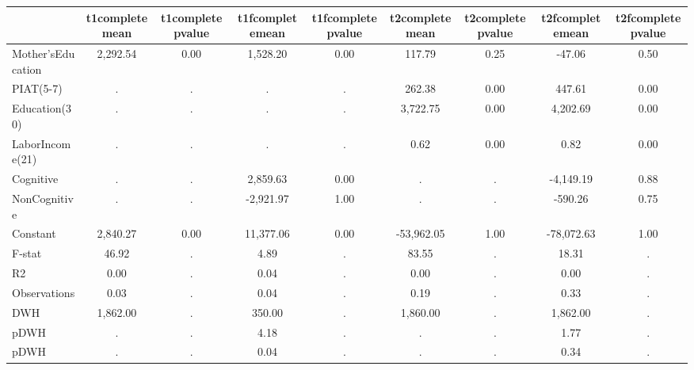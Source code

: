 \begin{table}[htbp]
\begin{tabular}{lcccccccc} \hline \hline
 & t1completemean  & t1completepvalue  & t1fcompletemean  & t1fcompletepvalue  & t2completemean  & t2completepvalue  & t2fcompletemean  & t2fcompletepvalue  \\  \hline 
Mother'sEducation &     2,292.54 &         0.00 &     1,528.20 &         0.00 &       117.79 &         0.25 &       -47.06 &         0.50 \\  
PIAT(5-7) &            . &            . &            . &            . &       262.38 &         0.00 &       447.61 &         0.00 \\  
Education(30) &            . &            . &            . &            . &     3,722.75 &         0.00 &     4,202.69 &         0.00 \\  
LaborIncome(21) &            . &            . &            . &            . &         0.62 &         0.00 &         0.82 &         0.00 \\  
Cognitive &            . &            . &     2,859.63 &         0.00 &            . &            . &    -4,149.19 &         0.88 \\  
NonCognitive &            . &            . &    -2,921.97 &         1.00 &            . &            . &      -590.26 &         0.75 \\  
Constant &     2,840.27 &         0.00 &    11,377.06 &         0.00 &   -53,962.05 &         1.00 &   -78,072.63 &         1.00 \\  
F-stat &        46.92 &            . &         4.89 &            . &        83.55 &            . &        18.31 &            . \\  
R2 &         0.00 &            . &         0.04 &            . &         0.00 &            . &         0.00 &            . \\  
Observations &         0.03 &            . &         0.04 &            . &         0.19 &            . &         0.33 &            . \\  
DWH &     1,862.00 &            . &       350.00 &            . &     1,860.00 &            . &     1,862.00 &            . \\  
pDWH &            . &            . &         4.18 &            . &            . &            . &         1.77 &            . \\  
pDWH &            . &            . &         0.04 &            . &            . &            . &         0.34 &            . \\  
\hline \hline \end{tabular}
\end{table}
